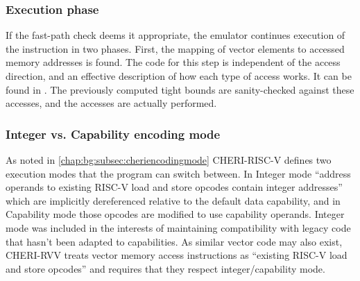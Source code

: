 \subsubsection{Execution phase}\label{chap:hardware:subsec:execution}
If the fast-path check deems it appropriate, the emulator continues execution of the instruction in two phases.
First, the mapping of vector elements to accessed memory addresses is found.
The code for this step is independent of the access direction, and an effective description of how each type of access works.
It can be found in .
The previously computed tight bounds are sanity-checked against these accesses, and the accesses are actually performed.

\subsubsection{Integer vs. Capability encoding mode\label{chap:emu:rvv_int_mode}}
As noted in \cref{chap:bg:subsec:cheriencodingmode} CHERI-RISC-V defines two execution modes that the program can switch between.
In Integer mode \enquote{address operands to existing RISC-V load and store opcodes contain integer addresses} which are implicitly dereferenced relative to the default data capability, and in Capability mode those opcodes are modified to use capability operands.
Integer mode was included in the interests of maintaining compatibility with legacy code that hasn't been adapted to capabilities.
As similar vector code may also exist, CHERI-RVV treats vector memory access instructions as \enquote{existing RISC-V load and store opcodes} and requires that they respect integer/capability mode.